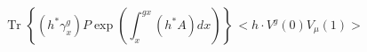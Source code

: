 \begin{equation}  \label{hamp}
\mbox{Tr }\left\{ (h^* \gamma^g_x) P \exp\left( \int_x^{g x} (h^*A) dx \right) \right\} \,
< h \cdot V^g(0) V_{\mu}(1) >
\end{equation}

